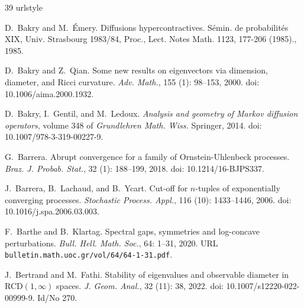 \documentclass[10pt,reqno]{amsart}
\numberwithin{equation}{section}
\begin{document}
% 

\begin{thebibliography}{39}
\providecommand{\natexlab}[1]{#1}
\providecommand{\url}[1]{\texttt{#1}}
\expandafter\ifx\csname urlstyle\endcsname\relax
  \providecommand{\doi}[1]{doi: #1}\else
  \providecommand{\doi}{doi: \begingroup \urlstyle{rm}\Url}\fi

D.~Bakry and M.~{\'E}mery.
\newblock Diffusions hypercontractives.
\newblock S{\'e}min. de probabilit{\'e}s {XIX}, {Univ}. {Strasbourg} 1983/84,
  {Proc}., {Lect}. {Notes} {Math}. 1123, 177-206 (1985)., 1985.

D.~Bakry and Z.~Qian.
\newblock Some new results on eigenvectors via dimension, diameter, and {Ricci}
  curvature.
\newblock \emph{Adv. Math.}, 155 (1): 98--153, 2000.
\newblock \doi{10.1006/aima.2000.1932}.

D.~Bakry, I.~Gentil, and M.~Ledoux.
\newblock \emph{Analysis and geometry of {Markov} diffusion operators}, volume
  348 of \emph{Grundlehren Math. Wiss.}
\newblock Springer, 2014.
\newblock \doi{10.1007/978-3-319-00227-9}.

G.~Barrera.
\newblock Abrupt convergence for a family of {O}rnstein-{U}hlenbeck processes.
\newblock \emph{Braz. J. Probab. Stat.}, 32 (1): 188--199,
  2018.
\newblock \doi{10.1214/16-BJPS337}.

J.~Barrera, B.~Lachaud, and B.~Ycart.
\newblock Cut-off for {$n$}-tuples of exponentially converging processes.
\newblock \emph{Stochastic Process. Appl.}, 116 (10):
  1433--1446, 2006.
\newblock \doi{10.1016/j.spa.2006.03.003}.

F.~Barthe and B.~Klartag.
\newblock Spectral gaps, symmetries and log-concave perturbations.
\newblock \emph{Bull. Hell. Math. Soc.}, 64: 1--31, 2020.
\newblock URL \url{bulletin.math.uoc.gr/vol/64/64-1-31.pdf}.

J.~Bertrand and M.~Fathi.
\newblock Stability of eigenvalues and observable diameter in {RCD}{{\((1,
  \infty)\)}} spaces.
\newblock \emph{J. Geom. Anal.}, 32 (11): 38, 2022.
\newblock \doi{10.1007/s12220-022-00999-9}.
\newblock Id/No 270.


\end{thebibliography}
\end{document}
